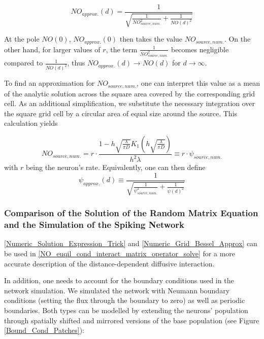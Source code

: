 \documentclass[10pt,a4paper]{article}
\begin{document}
\begin{equation}
NO_{approx.}(d) = \frac{1}{\sqrt{\frac{1}{NO_{source,num.}^2} + \frac{1}{NO(d)^2}}}
\label{Numeric_Solution_Expression_Trick}
\end{equation}

At the pole $NO(0)$, $NO_{approx.}(0)$ then takes the value $NO_{source,num.}$. On the other hand, for larger values of $r$, the term $\frac{1}{NO_{source,num.}^2}$ becomes negligible compared to $ \frac{1}{NO(d)^2}$, thus $NO_{approx.}(d) \rightarrow NO(d)$ for $d \rightarrow \infty$.

To find an approximation for $NO_{source,num.}$, one can interpret this value as a mean of the analytic solution across the square area covered by the corresponding grid cell. As an additional simplification, we substitute the necessary integration over the square grid cell by a circular area of equal size around the source. This calculation yields

\begin{equation}
NO_{source,num.} =  r \cdot \frac{1-h\sqrt{\frac{\lambda}{\pi D}} K_1\left( h\sqrt{\frac{\lambda}{\pi D}}\right) }{h^2 \lambda} \equiv r \cdot \psi_{source,num.}
\label{Numeric_Grid_Bessel_Approx}
\end{equation}
with $r$ being the neuron's rate. Equivalently, one can then define
\begin{equation}
\psi_{approx.}(d) \equiv \frac{1}{\sqrt{\frac{1}{\psi_{source,num.}^2} + \frac{1}{\psi (d)^2}}}
\end{equation}

\subsubsection{Comparison of the Solution of the Random Matrix Equation and the Simulation of the Spiking Network}

\eqref{Numeric_Solution_Expression_Trick} and \eqref{Numeric_Grid_Bessel_Approx} can be used in \eqref{NO_euqil_cond_interact_matrix_operator_solve} for a more accurate description of the distance-dependent diffusive interaction.

In addition, one needs to account for the boundary conditions used in the network simulation. We simulated the network with Neumann boundary conditions (setting the flux through the boundary to zero) as well as periodic boundaries. Both types can be modelled by extending the neurons' population through spatially shifted and mirrored versions of the base population (see Figure \ref{Bound_Cond_Patches}):
\end{document}
